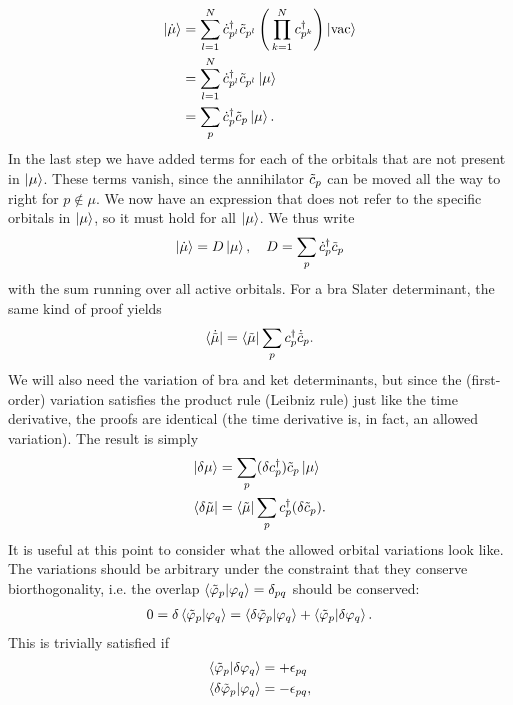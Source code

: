 \documentclass[aip,jcp,preprint,superscriptaddress,nofootinbib]{revtex4-1}
\begin{document}
\begin{align}
    \ket{\dot{\mu}} 
    &= \sum_{l=1}^{N}  \dot{c}^{\dagger}_{p^{\smash{l}}} \tilde{c}_{{p}^{l}}  \left( \, \prod_{k=1}^{N} c^{\dagger}_{p^{\smash{k}}} \right) \ket{\mathrm{vac}} \nonumber\\
    &= \sum_{l=1}^{N}  \dot{c}^{\dagger}_{p^{\smash{l}}} \tilde{c}_{{p}^{l}}  \ket{\mu} \nonumber\\
    &= \sum_{p}        \dot{c}^{\dagger}_{p} \tilde{c}_{p} \ket{\mu}.
\end{align}
In the last step we have added terms for each of the orbitals that are not present in $\ket{\mu}$. These terms vanish, since the annihilator
$\tilde{c}_{p}$ can be moved all the way to right for $p \notin \mu$. We now have an expression that does not refer to the specific orbitals
in $\ket{\mu}$, so it must hold for all $\ket{\mu}$. We thus write
\begin{align}
    \ket{\dot{\mu}} = D \ket{\mu}, \quad D = \sum_{p} \dot{c}^{\dagger}_{p} \tilde{c}_{p}
\end{align}
with the sum running over all active orbitals. For a bra Slater determinant, the same kind of proof yields
\begin{align}
    \bra{\dot{\tilde{\mu}}} = \bra{\tilde{\mu}} \sum_{p} c^{\dagger}_{p} \dot{\tilde{c}}_{p}.
\end{align}
We will also need the variation of bra and ket determinants, but since
the (first-order) variation satisfies the product rule (Leibniz rule) just like
the time derivative, the proofs are identical (the time derivative is, in fact,
an allowed variation). The result is simply
\begin{subequations} \label{eq:variation_of_mu_and_mu_tilde}
    \begin{align}
        \ket{\delta \mu}         &= \sum_{p} (\delta c^{\dagger}_{p}) \tilde{c}_{p} \ket{\mu} \\
        \bra{\delta \tilde{\mu}} &= \bra{\tilde{\mu}} \sum_{p} c^{\dagger}_{p} (\delta\tilde{c}_{p}).
    \end{align}
\end{subequations}
It is useful at this point to consider what the allowed
orbital variations look like. The variations should be
arbitrary under the constraint that they
conserve biorthogonality, i.e. the overlap
$\braket{\tilde{\varphi}_{p} | \varphi_{q}} = \delta_{pq}$
should be conserved:
\begin{align}
    0 = \delta \braket{\tilde{\varphi}_{p} | \varphi_{q}} = 
    \braket{\delta\tilde{\varphi}_{p} | \varphi_{q}} + \braket{\tilde{\varphi}_{p} | \delta\varphi_{q}}.
\end{align}
This is trivially satisfied if
\begin{subequations} \label{eq:bra_ket_variation_link}
    \begin{align}
        \braket{\tilde{\varphi}_{p} | \delta\varphi_{q}} &= +\epsilon_{pq} \\
        \braket{\delta\tilde{\varphi}_{p} | \varphi_{q}} &= -\epsilon_{pq},
    \end{align}
\end{subequations}
\end{document}
